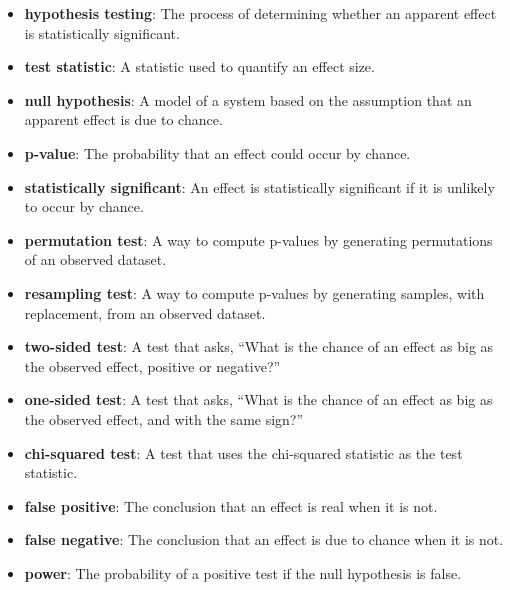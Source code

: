 \documentclass[12pt]{book}
\begin{document}
\begin{itemize}

\item {\bf hypothesis testing}: The process of determining whether an apparent
effect is statistically significant.

\item {\bf test statistic}: A statistic used to quantify an effect size.

\item {\bf null hypothesis}: A model of a system based on the assumption that
an apparent effect is due to chance.

\item {\bf p-value}: The probability that an effect could occur by chance.

\item {\bf statistically significant}: An effect is statistically
  significant if it is unlikely to occur by chance.
   

\item {\bf permutation test}: A way to compute p-values by generating
  permutations of an observed dataset.

\item {\bf resampling test}: A way to compute p-values by generating
  samples, with replacement, from an observed dataset.

\item {\bf two-sided test}: A test that asks, ``What is the chance of an effect
as big as the observed effect, positive or negative?''

\item {\bf one-sided test}: A test that asks, ``What is the chance of an effect
as big as the observed effect, and with the same sign?''

\item {\bf chi-squared test}: A test that uses the chi-squared statistic as
the test statistic.

\item {\bf false positive}: The conclusion that an effect is real when it is not.

\item {\bf false negative}: The conclusion that an effect is due to chance when it
is not.

\item {\bf power}: The probability of a positive test if the null hypothesis
is false.

\end{itemize}
\end{document}
